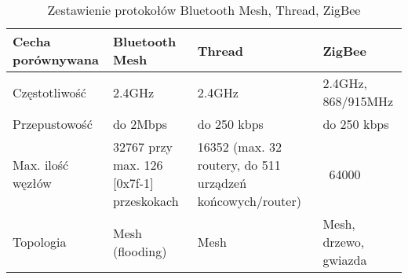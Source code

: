 \begin{table}[!ht]
\centering
	\begin{tabular}{p{2.5cm}|m{3.5cm}|m{3.5cm}|m{3.5cm}}
	Cecha porównywana & Bluetooth Mesh & Thread & ZigBee\\\hline
	Częstotliwość & 2.4GHz & 2.4GHz & 2.4GHz, 868/915MHz\\\hline
	Przepustowość & do 2Mbps & do 250 kbps & do 250 kbps\\\hline
	Max. ilość węzłów & 32767 przy max. 126 [0x7f-1] przeskokach\cite{mesh_working_group_mesh_2019} & 16352 (max. 32 routery, do 511 urządzeń końcowych/router)\cite{noauthor_node_2022} & ~64000\\\hline
	Topologia & Mesh (flooding) & Mesh & Mesh, drzewo, gwiazda\\\hline
	\end{tabular}
\caption{\label{tab:protokoly_zestawienie}Zestawienie protokołów Bluetooth Mesh, Thread, ZigBee}
\end{table}
